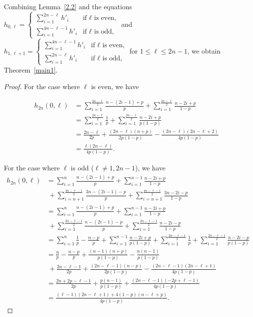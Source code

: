 \documentclass[12pt, leqno]{amsart}
\numberwithin{equation}{section}
\theoremstyle{plain}
\theoremstyle{definition}
\newcommand{\0}{\mathbf{0}}
\begin{document}
Combining Lemma~\ref{2.2} and the equations 
$h_{0,\ell}=\begin{cases}
\sum_{i=1}^{2n-\ell}h'_i &\text{if $\ell$ is even,}\\
\sum_{i=1}^{4n-\ell-1}h'_i &\text{if $\ell$ is odd,}
\end{cases}$ and $h_{1,\ell+1}=\begin{cases}
\sum_{i=1}^{4n-\ell-1}h'_i &\text{if $\ell$ is even,}\\
\sum_{i=1}^{2n-\ell}h'_i &\text{if $\ell$ is odd,}
\end{cases}$ 
for $1\leq \ell\leq 2n-1$, we obtain Theorem~\ref{main1}.

\begin{proof}

For the case where $\ell$ is even, we have

\begin{align*}
h_{2n}(0,\ell)&=\sum_{i=1}^{\frac{2n-\ell}{2}}\frac{n-(2i-1)+p}{p}+\sum_{i=1}^{\frac{2n-\ell}{2}}\frac{n-2i+p}{1-p}\\
&=\sum_{i=1}^{\frac{2n-\ell}{2}}\frac{1}{p}+\sum_{i=1}^{\frac{2n-\ell}{2}}\frac{n-2i+p}{p(1-p)}\\
&=\frac{2n-\ell}{2p}+\frac{(2n-\ell)(n+p)}{2p(1-p)}-\frac{(2n-\ell)(2n-\ell+2)}{4p(1-p)}\\
&=\frac{\ell(2n-\ell)}{4p(1-p)}.
\end{align*}

For the case where $\ell$ is odd ($\ell\neq1,2n-1$), we have
\begin{align*}
h_{2n}(0,\ell)&=\sum_{i=1}^n\frac{n-(2i-1)+p}{p}+\sum_{i=1}^{n-1}\frac{n-2i+p}{1-p}\\
&~+\sum_{i=n+1}^{\frac{4n-\ell-1}{2}}\frac{3n-(2i-1)-p}{p}+\sum_{i=n+1}^{\frac{4n-\ell-1}{2}}\frac{3n-2i-p}{1-p}\\
&=\sum_{i=1}^n\frac{n-(2i-1)+p}{p}+\sum_{i=1}^{n-1}\frac{n-2i+p}{1-p}\\
&~+\sum_{i=1}^{\frac{2n-\ell-1}{2}}\frac{n-(2i-1)-p}{p}+\sum_{i=1}^{\frac{2n-\ell-1}{2}}\frac{n-2i-p}{1-p}\\
&=\sum_{i=1}^n\frac{1}{p}-\frac{n-p}{p}+\sum_{i=1}^{n-1}\frac{n-2i+p}{p(1-p)}+\sum_{i=1}^{\frac{2n-\ell-1}{2}}\frac{1}{p}+\sum_{i=1}^{\frac{2n-\ell-1}{2}}\frac{n-2i-p}{p(1-p)}\\
&=\frac{n}{p}-\frac{n-p}{p}+\frac{(n-1)(n+p)}{p(1-p)}-\frac{n(n-1)}{p(1-p)}\\
&~+\frac{2n-\ell-1}{2p}+\frac{(2n-\ell-1)(n-p)}{2p(1-p)}-\frac{(2n-\ell-1)(2n-\ell+1)}{4p(1-p)}\\
&=\frac{2n+2p-\ell-1}{2p}+\frac{p(n-1)}{p(1-p)}+\frac{(2n-\ell-1)(-2p+\ell-1)}{4p(1-p)}\\
&=\frac{(\ell-1)(2n-\ell+1)+4(1-p)(n-\ell+p)}{4p(1-p)}.
\end{align*}


\end{proof}
\end{document}
